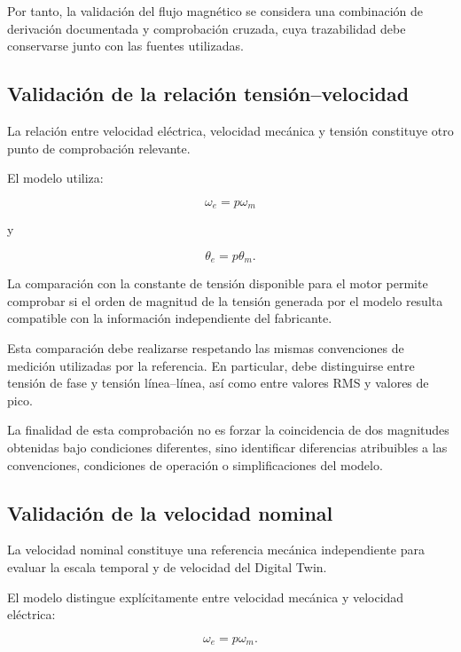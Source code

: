 Por tanto, la validación del flujo magnético se considera una combinación de derivación documentada y comprobación cruzada, cuya trazabilidad debe conservarse junto con las fuentes utilizadas.

\subsection{Validación de la relación tensión--velocidad}

La relación entre velocidad eléctrica, velocidad mecánica y tensión constituye otro punto de comprobación relevante.

El modelo utiliza:

\begin{equation}
\omega_e=p\omega_m
\end{equation}

y

\begin{equation}
\theta_e=p\theta_m.
\end{equation}

La comparación con la constante de tensión disponible para el motor permite comprobar si el orden de magnitud de la tensión generada por el modelo resulta compatible con la información independiente del fabricante.

Esta comparación debe realizarse respetando las mismas convenciones de medición utilizadas por la referencia. En particular, debe distinguirse entre tensión de fase y tensión línea--línea, así como entre valores RMS y valores de pico.

La finalidad de esta comprobación no es forzar la coincidencia de dos magnitudes obtenidas bajo condiciones diferentes, sino identificar diferencias atribuibles a las convenciones, condiciones de operación o simplificaciones del modelo.

\subsection{Validación de la velocidad nominal}

La velocidad nominal constituye una referencia mecánica independiente para evaluar la escala temporal y de velocidad del Digital Twin.

El modelo distingue explícitamente entre velocidad mecánica y velocidad eléctrica:

\begin{equation}
\omega_e=p\omega_m.
\end{equation}

